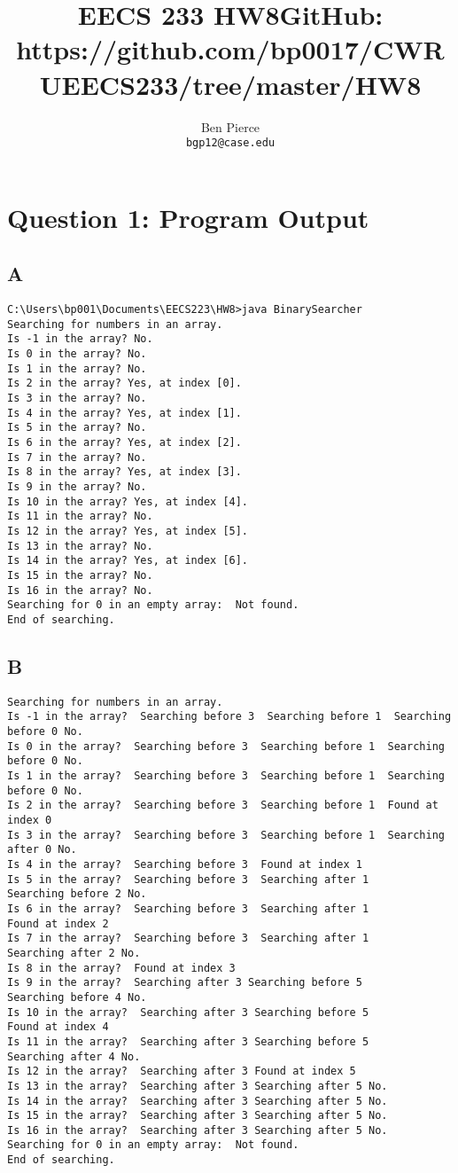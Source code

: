 \documentclass[12pt]{article} %
\title{EECS 233 HW8}
\author{Ben Pierce \\ \texttt{bgp12@case.edu}}
\begin{document}
\maketitle
\title {GitHub: https://github.com/bp0017/CWRUEECS233/tree/master/HW8} 

\section{Question 1: Program Output}
\subsection{A}
\begin{lstlisting}
C:\Users\bp001\Documents\EECS223\HW8>java BinarySearcher
Searching for numbers in an array.
Is -1 in the array? No.
Is 0 in the array? No.
Is 1 in the array? No.
Is 2 in the array? Yes, at index [0].
Is 3 in the array? No.
Is 4 in the array? Yes, at index [1].
Is 5 in the array? No.
Is 6 in the array? Yes, at index [2].
Is 7 in the array? No.
Is 8 in the array? Yes, at index [3].
Is 9 in the array? No.
Is 10 in the array? Yes, at index [4].
Is 11 in the array? No.
Is 12 in the array? Yes, at index [5].
Is 13 in the array? No.
Is 14 in the array? Yes, at index [6].
Is 15 in the array? No.
Is 16 in the array? No.
Searching for 0 in an empty array:  Not found.
End of searching.
\end{lstlisting}

\subsection{B}
\begin{lstlisting}
Searching for numbers in an array.
Is -1 in the array?  Searching before 3  Searching before 1  Searching before 0 No.
Is 0 in the array?  Searching before 3  Searching before 1  Searching before 0 No.
Is 1 in the array?  Searching before 3  Searching before 1  Searching before 0 No.
Is 2 in the array?  Searching before 3  Searching before 1  Found at index 0
Is 3 in the array?  Searching before 3  Searching before 1  Searching after 0 No.
Is 4 in the array?  Searching before 3  Found at index 1
Is 5 in the array?  Searching before 3  Searching after 1 
Searching before 2 No.
Is 6 in the array?  Searching before 3  Searching after 1 
Found at index 2
Is 7 in the array?  Searching before 3  Searching after 1 
Searching after 2 No.
Is 8 in the array?  Found at index 3
Is 9 in the array?  Searching after 3 Searching before 5  
Searching before 4 No.
Is 10 in the array?  Searching after 3 Searching before 5  
Found at index 4
Is 11 in the array?  Searching after 3 Searching before 5  
Searching after 4 No.
Is 12 in the array?  Searching after 3 Found at index 5
Is 13 in the array?  Searching after 3 Searching after 5 No.
Is 14 in the array?  Searching after 3 Searching after 5 No.
Is 15 in the array?  Searching after 3 Searching after 5 No.
Is 16 in the array?  Searching after 3 Searching after 5 No.
Searching for 0 in an empty array:  Not found.
End of searching.
\end{lstlisting}
\end{document}
